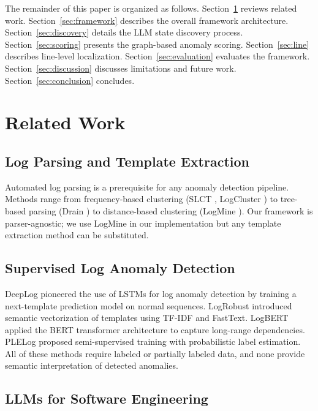 \documentclass[11pt]{article}
\begin{document}
The remainder of this paper is organized as follows. Section~\ref{sec:related} reviews related work. Section~\ref{sec:framework} describes the overall framework architecture. Section~\ref{sec:discovery} details the LLM state discovery process. Section~\ref{sec:scoring} presents the graph-based anomaly scoring. Section~\ref{sec:line} describes line-level localization. Section~\ref{sec:evaluation} evaluates the framework. Section~\ref{sec:discussion} discusses limitations and future work. Section~\ref{sec:conclusion} concludes.

\section{Related Work}
\label{sec:related}

\subsection{Log Parsing and Template Extraction}

Automated log parsing is a prerequisite for any anomaly detection pipeline. Methods range from frequency-based clustering (SLCT \cite{vaarandi2003data}, LogCluster \cite{vaarandi2015logcluster}) to tree-based parsing (Drain \cite{he2017drain}) to distance-based clustering (LogMine \cite{hamooni2016logmine}). Our framework is parser-agnostic; we use LogMine in our implementation but any template extraction method can be substituted.

\subsection{Supervised Log Anomaly Detection}

DeepLog \cite{du2017deeplog} pioneered the use of LSTMs for log anomaly detection by training a next-template prediction model on normal sequences. LogRobust \cite{zhang2019robust} introduced semantic vectorization of templates using TF-IDF and FastText. LogBERT \cite{guo2021logbert} applied the BERT transformer architecture to capture long-range dependencies. PLELog \cite{yang2021plelog} proposed semi-supervised training with probabilistic label estimation. All of these methods require labeled or partially labeled data, and none provide semantic interpretation of detected anomalies.

\subsection{LLMs for Software Engineering}
\end{document}
